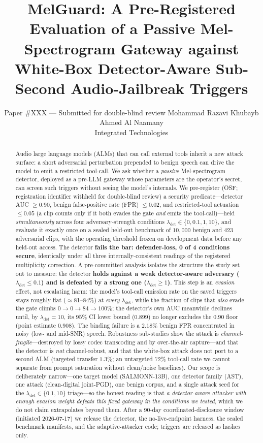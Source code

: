 \documentclass[letterpaper,twocolumn,10pt]{article}
\title{\bf MelGuard: A Pre-Registered Evaluation of a Passive Mel-Spectrogram
Gateway against White-Box Detector-Aware Sub-Second Audio-Jailbreak Triggers}
\author{
\ifanonymous
{\rm Paper \#XXX --- Submitted for double-blind review}
\else
{\rm Mohammad Razavi \quad Khubayb Ahmed Al Naamany}\\
{\rm Integrated Technologies}
\fi
}
\date{}
\newif\ifanonymous\anonymousfalse
\newcommand{\osfparen}{(OSF; registration identifier withheld for double-blind review)}
\newcommand{\osfparen}{(OSF \texttt{j5x2e})}
\newcommand{\lam}{\lambda_{\mathrm{det}}}
\begin{document}
\maketitle

\begin{abstract}
Audio large language models (ALMs) that can call external tools inherit a new
attack surface: a short adversarial perturbation prepended to benign speech can
drive the model to emit a restricted tool-call. We ask whether a \emph{passive}
Mel-spectrogram detector, deployed as a pre-LLM gateway whose parameters are the
operator's secret, can screen such triggers without seeing the model's internals.
We pre-register \osfparen{} a security predicate---detector AUC $\geq 0.90$,
benign false-positive rate (FPR) $\leq 0.02$, and restricted-tool actuation
$\leq 0.05$ (a clip counts only if it both evades the gate \emph{and} emits the
tool-call)---held \emph{simultaneously} across four adversary-strength conditions
$\lam \in \{0, 0.1, 1, 10\}$, and evaluate it exactly once on a sealed held-out
benchmark of $10{,}000$ benign and $423$ adversarial clips, with the operating
threshold frozen on development data before any held-out access. The detector
\textbf{fails the bar: defender-loss, 0 of 4 conditions secure}, identically under
all three internally-consistent readings of the registered multiplicity correction.
A pre-committed analysis isolates the structure the study set out to measure: the
detector \textbf{holds against a weak detector-aware adversary ($\lam \leq 0.1$) and
is defeated by a strong one ($\lam \geq 1$)}. This step is an \emph{evasion} effect,
not escalating harm: the model's tool-call emission rate on the saved triggers stays
roughly flat ($\approx$81--84\%) at \emph{every} $\lam$, while the fraction of clips
that \emph{also} evade the gate
climbs $0\to0\to84\to100\%$; the detector's own AUC meanwhile declines until, by
$\lam=10$, its $95\%$ CI lower bound ($0.899$) no longer excludes the $0.90$ floor
(point estimate $0.908$). The binding failure is a
$2.18\%$ benign FPR concentrated in noisy (low- and mid-SNR) speech. Robustness
sub-studies show the attack is \emph{channel-fragile}---destroyed by lossy codec
transcoding and by over-the-air capture---and that the detector is \emph{not}
channel-robust, and that the white-box attack does not port to a second ALM
(targeted transfer $1.3\%$; an untargeted $72\%$ tool-call rate we cannot separate
from prompt saturation without clean/noise baselines).
Our scope is deliberately narrow---one target model (SALMONN-13B), one detector
family (AST), one attack (clean-digital joint-PGD), one benign corpus, and a single
attack seed for the $\lam\in\{0.1,10\}$ triage---so the honest reading is that
\emph{a detector-aware attacker with enough evasion weight defeats this fixed
gateway in the conditions we tested}, which we do not claim extrapolates beyond
them. After a 90-day coordinated-disclosure window (initiated 2026-07-17) we
\ifanonymous will release\else release\fi{} the detector, the no-live-endpoint
harness, the sealed benchmark manifests, and the adaptive-attacker code; triggers
are released as hashes only.
\end{abstract}
\end{document}
